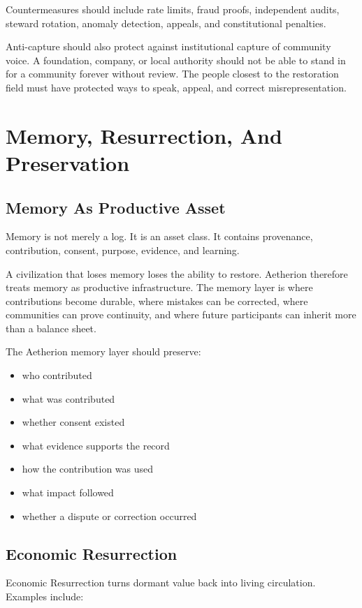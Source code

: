\documentclass[12pt]{article}
\begin{document}
Countermeasures should include rate limits, fraud proofs, independent audits, steward rotation, anomaly detection, appeals, and constitutional penalties.

Anti-capture should also protect against institutional capture of community voice. A foundation, company, or local authority should not be able to stand in for a community forever without review. The people closest to the restoration field must have protected ways to speak, appeal, and correct misrepresentation.

\section{Memory, Resurrection, And Preservation}

\subsection{Memory As Productive Asset}

Memory is not merely a log. It is an asset class. It contains provenance, contribution, consent, purpose, evidence, and learning.

A civilization that loses memory loses the ability to restore. Aetherion therefore treats memory as productive infrastructure. The memory layer is where contributions become durable, where mistakes can be corrected, where communities can prove continuity, and where future participants can inherit more than a balance sheet.

The Aetherion memory layer should preserve:

\begin{itemize}
  \item who contributed
  \item what was contributed
  \item whether consent existed
  \item what evidence supports the record
  \item how the contribution was used
  \item what impact followed
  \item whether a dispute or correction occurred
\end{itemize}

\subsection{Economic Resurrection}

Economic Resurrection turns dormant value back into living circulation. Examples include:
\end{document}
